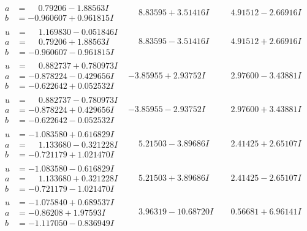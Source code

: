 \documentclass[1p]{elsarticle_modified}
\theoremstyle{definition}
\begin{document}
$$\begin{array}{c|c|c}
\begin{aligned}
a &= \phantom{-}0.79206 - 1.88563 I \\
b &= -0.960607 + 0.961815 I\end{aligned}
 & \phantom{-}8.83595 + 3.51416 I & \phantom{-}4.91512 - 2.66916 I \\ \hline\begin{aligned}
u &= \phantom{-}1.169830 - 0.051846 I \\
a &= \phantom{-}0.79206 + 1.88563 I \\
b &= -0.960607 - 0.961815 I\end{aligned}
 & \phantom{-}8.83595 - 3.51416 I & \phantom{-}4.91512 + 2.66916 I \\ \hline\begin{aligned}
u &= \phantom{-}0.882737 + 0.780973 I \\
a &= -0.878224 - 0.429656 I \\
b &= -0.622642 + 0.052532 I\end{aligned}
 & -3.85955 + 2.93752 I & \phantom{-}2.97600 - 3.43881 I \\ \hline\begin{aligned}
u &= \phantom{-}0.882737 - 0.780973 I \\
a &= -0.878224 + 0.429656 I \\
b &= -0.622642 - 0.052532 I\end{aligned}
 & -3.85955 - 2.93752 I & \phantom{-}2.97600 + 3.43881 I \\ \hline\begin{aligned}
u &= -1.083580 + 0.616829 I \\
a &= \phantom{-}1.133680 - 0.321228 I \\
b &= -0.721179 + 1.021470 I\end{aligned}
 & \phantom{-}5.21503 - 3.89686 I & \phantom{-}2.41425 + 2.65107 I \\ \hline\begin{aligned}
u &= -1.083580 - 0.616829 I \\
a &= \phantom{-}1.133680 + 0.321228 I \\
b &= -0.721179 - 1.021470 I\end{aligned}
 & \phantom{-}5.21503 + 3.89686 I & \phantom{-}2.41425 - 2.65107 I \\ \hline\begin{aligned}
u &= -1.075840 + 0.689537 I \\
a &= -0.86208 + 1.97593 I \\
b &= -1.117050 - 0.836949 I\end{aligned}
 & \phantom{-}3.96319 - 10.68720 I & \phantom{-}0.56681 + 6.96141 I \\ \hline\begin{aligned}

\end{aligned}
\end{array}$$
\end{document}
